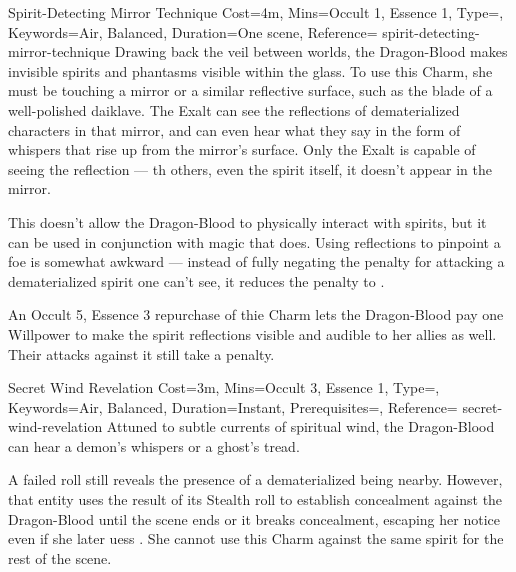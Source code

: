 \begin{Charm}{Spirit-Detecting Mirror Technique}{%
    Cost=4m,
    Mins={Occult 1, Essence 1},
    Type=\ReflexiveType,
    Keywords={Air, Balanced},
    Duration=One scene,
    Reference=\cite*[p.~230]{db}
}{spirit-detecting-mirror-technique}
    Drawing back the veil between worlds, the Dragon-Blood makes invisible
    spirits and phantasms visible within the glass. To use this Charm, she must
    be touching a mirror or a similar reflective surface, such as the blade of
    a well-polished daiklave. The Exalt can see the reflections of
    dematerialized characters in that mirror, and can even hear what they say
    in the form of whispers that rise up from the mirror's surface. Only the
    Exalt is capable of seeing the reflection --- th others, even the spirit
    itself, it doesn't appear in the mirror.

    This doesn't allow the Dragon-Blood to physically interact with spirits,
    but it can be used in conjunction with magic that does. Using reflections
    to pinpoint a foe is somewhat awkward --- instead of fully negating the
     penalty for attacking a dematerialized spirit one can't see,
    it reduces the penalty to .

    \begin{Unavailable}
        An Occult 5, Essence 3 repurchase of thie Charm lets the Dragon-Blood
        pay one Willpower to make the spirit reflections visible and audible to
        her allies as well. Their attacks against it still take a 
        penalty.
    \end{Unavailable}
\end{Charm}


\begin{Charm}{Secret Wind Revelation}{%
    Cost=3m,
    Mins={Occult 3, Essence 1},
    Type=\ReflexiveType,
    Keywords={Air, Balanced},
    Duration=Instant,
    Prerequisites=,
    Reference=\cite*[p.~231]{db}
}{secret-wind-revelation}
    Attuned to subtle currents of spiritual wind, the Dragon-Blood can hear a
    demon's whispers or a ghost's tread. 

    A failed roll still reveals the presence of a dematerialized being nearby.
    However, that entity uses the result of its Stealth roll to establish
    concealment against the Dragon-Blood until the scene ends or it breaks
    concealment, escaping her notice even if she later uess
    . She cannot use this
    Charm against the same spirit for the rest of the scene.
\end{Charm}



